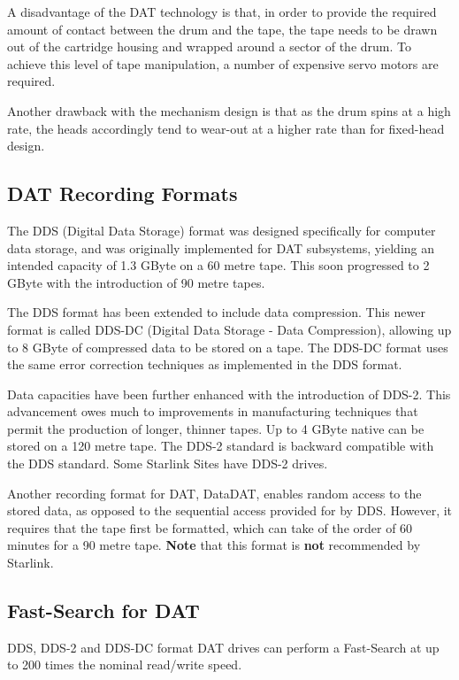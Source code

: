 A disadvantage of the DAT technology is that, in order to provide the required
amount of contact between the drum and the tape, the tape needs to be drawn
out of the cartridge housing and wrapped around a sector of the drum. To
achieve this level of tape manipulation, a number of expensive servo motors
are required.

Another drawback with the mechanism design is that as the drum spins at a
high rate, the heads accordingly tend to wear-out at a higher rate than for
fixed-head design.

\subsection {DAT Recording Formats}

The DDS (Digital Data Storage) format was designed specifically for computer
data storage, and was originally implemented for DAT subsystems, yielding an
intended capacity of 1.3 GByte on a 60 metre tape. This soon progressed to
2 GByte with the introduction of 90 metre tapes.

The DDS format has been extended to include data compression. This newer
format is called DDS-DC (Digital Data Storage - Data Compression), allowing
up to 8 GByte of compressed data to be stored on a tape. The DDS-DC format
uses the same error correction techniques as implemented in the DDS format.

Data capacities have been further enhanced with the introduction of DDS-2.
This advancement owes much to improvements in manufacturing techniques that
permit the production of longer, thinner tapes. Up to 4 GByte native can be
stored on a 120 metre tape. The DDS-2 standard is backward compatible with
the DDS standard. Some Starlink Sites have DDS-2 drives.

Another recording format for DAT, DataDAT, enables random access to the
stored data, as opposed to the sequential access provided for by DDS.
However, it requires that the tape first be formatted, which can take of the
order of 60 minutes for a 90 metre tape. {\bf Note} that this format is
{\bf not} recommended by Starlink.

\subsection {Fast-Search for DAT}

DDS, DDS-2 and DDS-DC format DAT drives can perform a Fast-Search at up to
200 times the nominal read/write speed.

